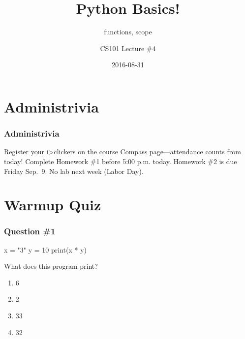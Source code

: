 \documentclass[11pt]{beamer}
\title{Python Basics!}
\subtitle{functions, scope}
\author{CS101 Lecture \#4}
\date{2016-08-31}
\begin{document}
  \setcounter{showProgressBar}{0}
  \setcounter{showSlideNumbers}{0}

\frame{\titlepage}

\setcounter{framenumber}{0}
\setcounter{showProgressBar}{1}
\setcounter{showSlideNumbers}{1}

\section{Administrivia}

\begin{frame}
  \frametitle{Administrivia}
  \Enlarge
  \begin{itemize}
  \myitem  Register your i>clickers on the course Compass page---attendance counts from today!
  \myitem  Complete Homework \#1 before 5:00 p.m. today.
  \myitem  Homework \#2 is due Friday Sep.\ 9.
  \myitem  No lab next week (Labor Day).
  \end{itemize}
\end{frame}

\section{Warmup Quiz}

\begin{frame}[fragile]
  \frametitle{Question \#1}
  \Enlarge

  \begin{semiverbatim}
x = "3"
y = 10 %
print(x * y)
  \end{semiverbatim}
  What does this program print?
  \begin{enumerate}[label=\Alph*]
  \item  6
  \item  2
  \item  33
  \item  32
  \end{enumerate}
\end{frame}
\end{document}
